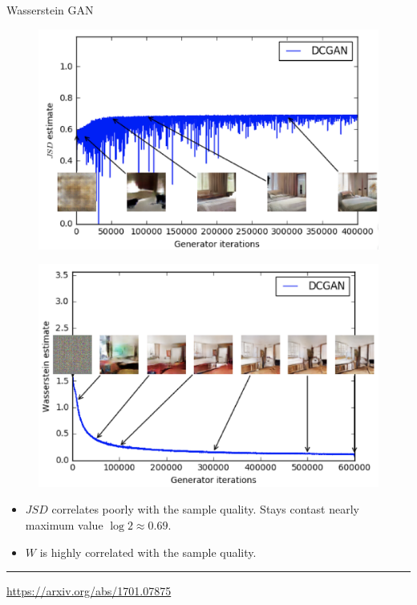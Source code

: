 \begin{frame}{Wasserstein GAN}
	\begin{minipage}[t]{0.49\columnwidth}
		\begin{figure}
			\centering
			\includegraphics[width=1.0\linewidth]{figs/dcgan_quality}
		\end{figure}
	\end{minipage}%
	\begin{minipage}[t]{0.49\columnwidth}
		\begin{figure}
			\centering
			\includegraphics[width=1.0\linewidth]{figs/wgan_quality}
		\end{figure}
	\end{minipage}
	\begin{itemize}
		\item $JSD$ correlates poorly with the sample quality. Stays contast nearly maximum value $\log 2 \approx 0.69$.
		\item $W$ is highly correlated with the sample quality. 
	\end{itemize}
	\vfill
	\hrule\medskip 
	{\scriptsize \href{https://arxiv.org/abs/1701.07875}{https://arxiv.org/abs/1701.07875}}
\end{frame}
